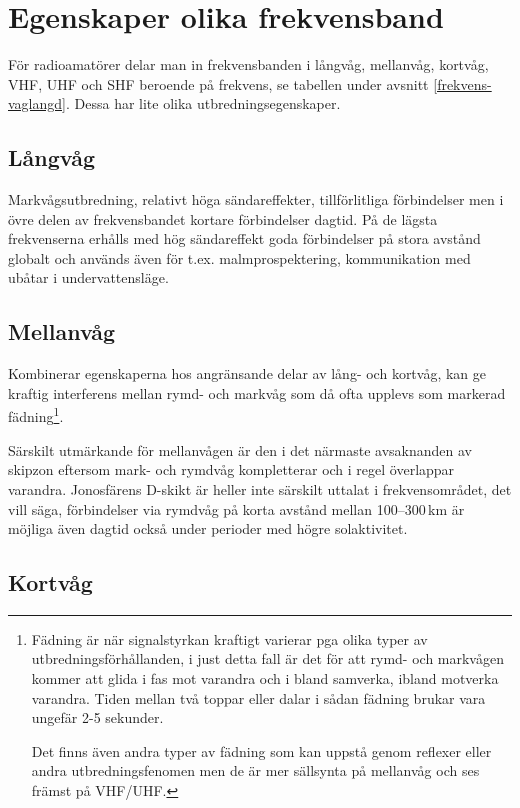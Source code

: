 \section{Egenskaper olika frekvensband}

För radioamatörer delar man in frekvensbanden i långvåg, mellanvåg, kortvåg,
VHF, UHF och SHF beroende på frekvens, se tabellen under avsnitt
\ref{frekvens-vaglangd}. Dessa har lite olika utbredningsegenskaper.

\subsection{Långvåg}

Markvågsutbredning, relativt höga sändareffekter, tillförlitliga
för\-bind\-el\-ser men i övre delen av frekvensbandet kortare förbindelser
dagtid. På de lägsta frekvenserna erhålls med hög sändareffekt goda förbindelser
på stora avstånd globalt och används även för t.ex. malmprospektering,
kommunikation med ubåtar i undervattensläge.

\subsection{Mellanvåg}

Kombinerar egenskaperna hos angränsande delar av lång- och kortvåg, kan ge
kraftig interferens mellan rymd- och markvåg som då ofta upplevs som markerad
fädning\footnote{Fädning är när signalstyrkan kraftigt varierar pga olika
typer av utbredningsförhållanden, i just detta fall är det för att rymd- och
markvågen kommer att glida i fas mot varandra och i bland samverka, ibland
motverka varandra. Tiden mellan två toppar eller dalar i sådan fädning brukar
vara ungefär 2-5 sekunder.

Det finns även andra typer av fädning som kan uppstå genom reflexer eller
andra utbredningsfenomen men de är mer sällsynta på mellanvåg och ses främst
på VHF/UHF.}.

Särskilt utmärkande för mellanvågen är den i det närmaste avsaknanden av
skipzon eftersom mark- och rymdvåg kompletterar och i regel överlappar
varandra. Jonosfärens D-skikt är heller inte särskilt uttalat i
frekvensområdet, det vill säga, förbindelser via rymdvåg på korta avstånd
mellan 100--300\,km är möjliga även dagtid också under perioder med högre
solaktivitet.

\subsection{Kortvåg}


